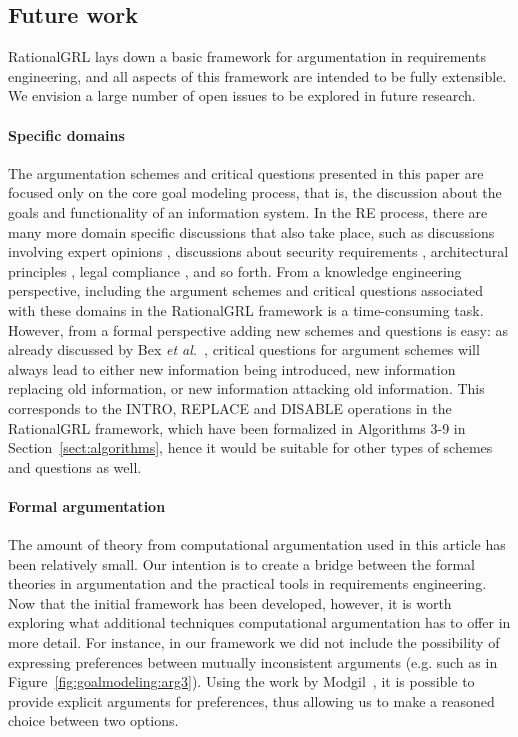\subsection{Future work}
\label{sect:discussion:futurework}

RationalGRL lays down a basic framework for argumentation in requirements engineering, and all aspects of this framework are intended to be fully extensible. We envision a large number of open issues to be explored in future research.

\paragraph{Specific domains}
The argumentation schemes and critical questions presented in this paper are focused only on the core goal modeling process, that is, the discussion about the goals and functionality of an information system. In the RE process, there are many more domain specific discussions that also take place, such as discussions involving expert opinions \cite{murukannaiah2015}, discussions about security requirements \cite{haley2008security,yu2015automated,ionita2014argumentation}, architectural principles \cite{marosin-etal:caise2016}, legal compliance \cite{Ghanavati2013}, and so forth. From a knowledge engineering perspective, including the argument schemes and critical questions associated with these domains in the RationalGRL framework is a time-consuming task. However, from a formal perspective adding new schemes and questions is easy: as already discussed by Bex \emph{et al.}~\cite{bexEtal2003}, critical questions for argument schemes will always lead to either new information being introduced, new information replacing old information, or new information attacking old information. This corresponds to the \textsf{INTRO}, \textsf{REPLACE} and \textsf{DISABLE} operations in the RationalGRL framework, which have been formalized in Algorithms 3-9 in Section~\ref{sect:algorithms}, hence it would be suitable for other types of schemes and questions as well.

\paragraph{Formal argumentation}
The amount of theory from computational argumentation used in this article has been relatively small. Our intention is to create a bridge between the formal theories in argumentation and the practical tools in requirements engineering. Now that the initial framework has been developed, however, it is worth exploring what additional techniques computational argumentation has to offer in more detail. For instance, in our framework we did not include the possibility of expressing preferences between mutually inconsistent arguments (e.g. such as in Figure~\ref{fig:goalmodeling:arg3}). Using the work by Modgil~\cite{modgil2009}, it is possible to provide explicit arguments for preferences, thus allowing us to make a reasoned choice between two options. 

